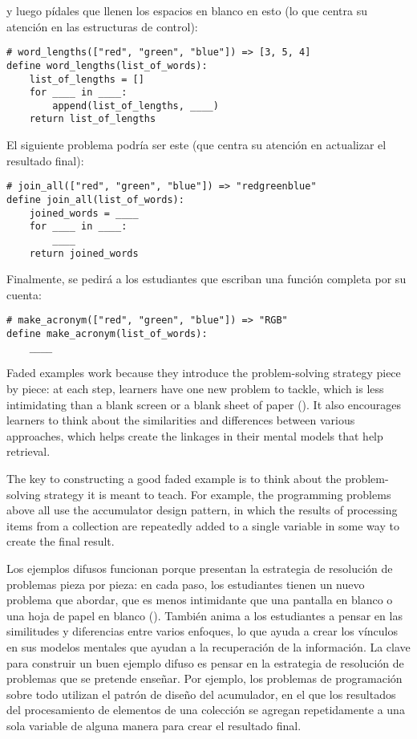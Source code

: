 {\noindent

y luego pídales que llenen los espacios en blanco en esto 
(lo que centra su atención en las estructuras de control):


\begin{verbatim}
# word_lengths(["red", "green", "blue"]) => [3, 5, 4]
define word_lengths(list_of_words):
    list_of_lengths = []
    for ____ in ____:
        append(list_of_lengths, ____)
    return list_of_lengths
\end{verbatim}

El siguiente problema podría ser este 
(que centra su atención en actualizar el resultado final):

\begin{verbatim}
# join_all(["red", "green", "blue"]) => "redgreenblue"
define join_all(list_of_words):
    joined_words = ____
    for ____ in ____:
        ____
    return joined_words
\end{verbatim}

Finalmente, se pedirá a los estudiantes que escriban una función completa por su cuenta:

\begin{verbatim}
# make_acronym(["red", "green", "blue"]) => "RGB"
define make_acronym(list_of_words):
    ____
\end{verbatim}

Faded examples work because
they introduce the problem-solving strategy piece by piece:
at each step,
learners have one new problem to tackle,
which is less intimidating than a blank screen or a blank sheet of paper ().
It also encourages learners to think about the similarities and differences between various approaches,
which helps create the linkages in their mental models that help retrieval.

The key to constructing a good faded example is
to think about the problem-solving strategy it is meant to teach.
For example,
the programming problems above all use the accumulator design pattern,
in which the results of processing items from a collection
are repeatedly added to a single variable in some way to create the final result.

Los ejemplos difusos funcionan porque presentan la estrategia de resolución de problemas pieza por pieza: en cada paso, los estudiantes tienen un nuevo problema que abordar, que es menos intimidante que una pantalla en blanco o una hoja de papel en blanco (). También anima a los estudiantes a pensar en las similitudes y diferencias entre varios enfoques, lo que ayuda a crear los vínculos en sus modelos mentales que ayudan a la recuperación de la información.
La clave para construir un buen ejemplo difuso es pensar en la estrategia de resolución de problemas que se pretende enseñar. Por ejemplo, los problemas de programación sobre todo utilizan el patrón de diseño del acumulador, en el que los resultados del procesamiento de elementos de una colección se agregan repetidamente a una sola variable de alguna manera para crear el resultado final.


}
